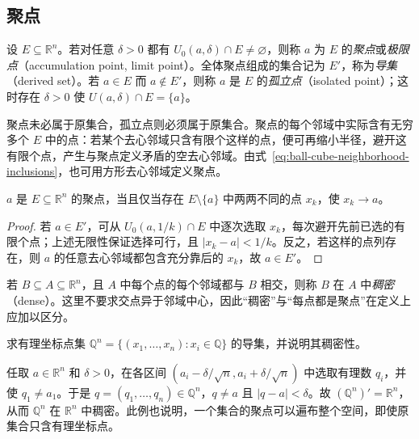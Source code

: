 \documentclass[UTF8,12pt,a4paper,fontset=fandol]{ctexbook}
\begin{document}
\subsection{聚点}
\label{subsec:accumulation-points-in-euclidean-space}

\begin{definition}
\label{def:euclidean-accumulation-and-isolated-points}
设 $E\subseteq\mathbb R^n$。若对任意 $\delta>0$ 都有 $U_0(a,\delta)\cap E\neq\varnothing$，则称 $a$ 为 $E$ 的\emph{聚点}或\emph{极限点}（accumulation point, limit point）。全体聚点组成的集合记为 $E'$，称为\emph{导集}（derived set）。若 $a\in E$ 而 $a\notin E'$，则称 $a$ 是 $E$ 的\emph{孤立点}（isolated point）；这时存在 $\delta>0$ 使 $U(a,\delta)\cap E=\{a\}$。
\end{definition}

聚点未必属于原集合，孤立点则必须属于原集合。聚点的每个邻域中实际含有无穷多个 $E$ 中的点：若某个去心邻域只含有限个这样的点，便可再缩小半径，避开这有限个点，产生与聚点定义矛盾的空去心邻域。由式~\eqref{eq:ball-cube-neighborhood-inclusions}，也可用方形去心邻域定义聚点。

\begin{theorem}[聚点的点列刻画]
\label{thm:euclidean-accumulation-sequence-criterion}
$a$ 是 $E\subseteq\mathbb R^n$ 的聚点，当且仅当存在 $E\setminus\{a\}$ 中两两不同的点 $x_k$，使 $x_k\to a$。
\end{theorem}

\begin{proof}
若 $a\in E'$，可从 $U_0(a,1/k)\cap E$ 中逐次选取 $x_k$，每次避开先前已选的有限个点；上述无限性保证选择可行，且 $|x_k-a|<1/k$。反之，若这样的点列存在，则 $a$ 的任意去心邻域都包含充分靠后的 $x_k$，故 $a\in E'$。
\end{proof}

若 $B\subseteq A\subseteq\mathbb R^n$，且 $A$ 中每个点的每个邻域都与 $B$ 相交，则称 $B$ 在 $A$ 中\emph{稠密}（dense）。这里不要求交点异于邻域中心，因此“稠密”与“每点都是聚点”在定义上应加以区分。

\begin{example}
\label{ex:rational-coordinate-points-dense}
求有理坐标点集 $\mathbb Q^n=\{(x_1,\ldots,x_n):x_i\in\mathbb Q\}$ 的导集，并说明其稠密性。
\end{example}

\begin{solve}
任取 $a\in\mathbb R^n$ 和 $\delta>0$，在各区间 $(a_i-\delta/\sqrt n,a_i+\delta/\sqrt n)$ 中选取有理数 $q_i$，并使 $q_1\neq a_1$。于是 $q=(q_1,\ldots,q_n)\in\mathbb Q^n$，$q\neq a$ 且 $|q-a|<\delta$。故 $(\mathbb Q^n)'=\mathbb R^n$，从而 $\mathbb Q^n$ 在 $\mathbb R^n$ 中稠密。此例也说明，一个集合的聚点可以遍布整个空间，即使原集合只含有理坐标点。
\end{solve}
\end{document}
